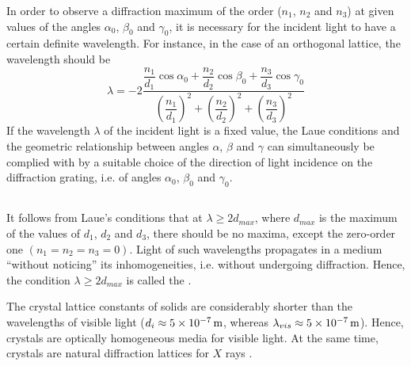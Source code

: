 In order to observe a diffraction maximum of the order ($n_{1}$, $n_{2}$ and $n_{3}$) at given values of the angles $\alpha_{0}$, $\beta_{0}$ and $\gamma_{0}$, it is necessary for the incident light to have a certain definite wavelength.
For instance, in the case of an orthogonal lattice, the wavelength should be
\begin{equation*}%
\lambda = -2 \frac{\dfrac{n_{1}}{d_{1}} \cos \alpha_{0} + \dfrac{n_{2}}{d_{2}} \cos \beta_{0} + \dfrac{n_{3}}{d_{3}} \cos \gamma_{0} }{\left( \dfrac{n_{1}}{d_{1}}\right)^{2} + \left( \dfrac{n_{2}}{d_{2}}\right)^{2} + \left( \dfrac{n_{3}}{d_{3}}\right)^{2}}
\end{equation*}
If the wavelength $\lambda$ of the incident light is a fixed value, the Laue conditions and the geometric relationship between angles $\alpha$, $\beta$ and $\gamma$ can simultaneously be complied with by a suitable choice of the direction of light incidence on the diffraction
grating, i.e. of angles $\alpha_{0}$, $\beta_{0}$ and $\gamma_{0}$.

\subsection{}\label{33.4.3} It follows from Laue's conditions that at $\lambda \geqslant 2d_{max}$, where $d_{max}$ is the maximum of the values of $d_{1}$, $d_{2}$ and $d_{3}$, there should be no maxima, except the zero-order one $(n_{1} = n_{2} = n_{3} = 0)$. Light of such wavelengths propagates in a medium ``without noticing'' its inhomogeneities, i.e. without undergoing diffraction. Hence, the condition $\lambda \geqslant 2d_{max}$ is called the .

The crystal lattice constants of solids are considerably shorter than the wavelengths of visible light ($d_{i} \approx   \SI{5d-7}{\meter}$, whereas $\lambda_{vis} \approx \SI{5d-7}{\meter}$). Hence, crystals are optically homogeneous
media for visible light. At the same time, crystals are natural diffraction lattices for $X$ rays .

